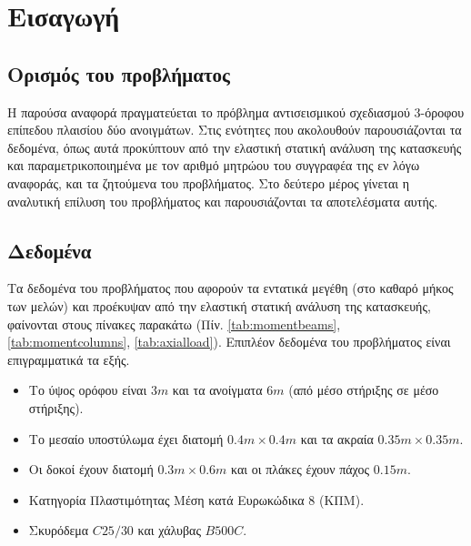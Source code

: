 \pagestyle{fancy}
\chapter{Εισαγωγή}
\section{Ορισμός του προβλήματος}
Η παρούσα αναφορά πραγματεύεται το πρόβλημα αντισεισμικού σχεδιασμού 3-όροφου επίπεδου πλαισίου δύο ανοιγμάτων. Στις ενότητες που ακολουθούν παρουσιάζονται τα δεδομένα, όπως αυτά προκύπτουν από την ελαστική στατική ανάλυση της κατασκευής και παραμετρικοποιημένα με τον αριθμό μητρώου του συγγραφέα της εν λόγω αναφοράς, και τα ζητούμενα του προβλήματος. Στο δεύτερο μέρος γίνεται η αναλυτική επίλυση του προβλήματος και παρουσιάζονται τα αποτελέσματα αυτής.

\section{Δεδομένα}
Τα δεδομένα του προβλήματος που αφορούν τα εντατικά μεγέθη (στο καθαρό μήκος των μελών) και προέκυψαν από την ελαστική στατική ανάλυση της κατασκευής, φαίνονται στους πίνακες παρακάτω (Πίν. \ref{tab:momentbeams}, \ref{tab:momentcolumns}, \ref{tab:axialload}). Επιπλέον δεδομένα του προβλήματος είναι επιγραμματικά τα εξής.

\begin{itemize}
  \item Το ύψος ορόφου είναι $3m$ και τα ανοίγματα $6m$ (από μέσο στήριξης σε μέσο στήριξης).
  \item Το μεσαίο υποστύλωμα έχει διατομή $0.4m\times0.4m$ και τα ακραία $0.35m\times0.35m$.
  \item Οι δοκοί έχουν διατομή $0.3m\times0.6m$ και οι πλάκες έχουν πάχος $0.15m$.
  \item Κατηγορία Πλαστιμότητας Μέση κατά Ευρωκώδικα $8$ (ΚΠΜ).
  \item Σκυρόδεμα $C25/30$ και χάλυβας $B500C$.
\end{itemize}

